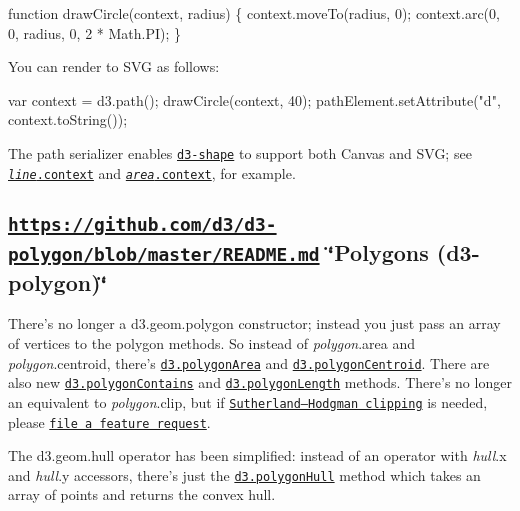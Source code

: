 \begin{DoxyCode}
function drawCircle(context, radius) \{
  context.moveTo(radius, 0);
  context.arc(0, 0, radius, 0, 2 * Math.PI);
\}
\end{DoxyCode}


You can render to S\+VG as follows\+:


\begin{DoxyCode}
var context = d3.path();
drawCircle(context, 40);
pathElement.setAttribute("d", context.toString());
\end{DoxyCode}


The path serializer enables \href{#shapes-d3-shape}{\tt d3-\/shape} to support both Canvas and S\+VG; see \href{https://github.com/d3/d3-shape/blob/master/README.md#line_context}{\tt {\itshape line}.context} and \href{https://github.com/d3/d3-shape/blob/master/README.md#area_context}{\tt {\itshape area}.context}, for example.

\subsection*{\href{https://github.com/d3/d3-polygon/blob/master/README.md}{\tt https\+://github.\+com/d3/d3-\/polygon/blob/master/\+R\+E\+A\+D\+M\+E.\+md} \char`\"{}\+Polygons (d3-\/polygon)\char`\"{}}

There’s no longer a d3.\+geom.\+polygon constructor; instead you just pass an array of vertices to the polygon methods. So instead of {\itshape polygon}.area and {\itshape polygon}.centroid, there’s \href{https://github.com/d3/d3-polygon/blob/master/README.md#polygonArea}{\tt d3.\+polygon\+Area} and \href{https://github.com/d3/d3-polygon/blob/master/README.md#polygonCentroid}{\tt d3.\+polygon\+Centroid}. There are also new \href{https://github.com/d3/d3-polygon/blob/master/README.md#polygonContains}{\tt d3.\+polygon\+Contains} and \href{https://github.com/d3/d3-polygon/blob/master/README.md#polygonLength}{\tt d3.\+polygon\+Length} methods. There’s no longer an equivalent to {\itshape polygon}.clip, but if \href{https://en.wikipedia.org/wiki/Sutherland–Hodgman_algorithm}{\tt Sutherland–\+Hodgman clipping} is needed, please \href{https://github.com/d3/d3-polygon/issues}{\tt file a feature request}.

The d3.\+geom.\+hull operator has been simplified\+: instead of an operator with {\itshape hull}.x and {\itshape hull}.y accessors, there’s just the \href{https://github.com/d3/d3-polygon/blob/master/README.md#polygonHull}{\tt d3.\+polygon\+Hull} method which takes an array of points and returns the convex hull.

